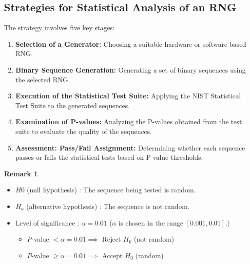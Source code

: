 \documentclass[12pt,openany]{book}
\theoremstyle{definition}
\newtheorem{remark}{Remark}[chapter]
\begin{document}
	\subsection{Strategies for Statistical Analysis of an RNG}
	The strategy involves five key stages:
	\begin{enumerate}
		\item \textbf{Selection of a Generator:} Choosing a suitable hardware or software-based RNG.
		\item \textbf{Binary Sequence Generation:} Generating a set of binary sequences using the selected RNG.
		\item \textbf{Execution of the Statistical Test Suite:} Applying the NIST Statistical Test Suite to the generated sequences.
		\item \textbf{Examination of P-values:} Analyzing the P-values obtained from the test suite to evaluate the quality of the sequences.
		\item \textbf{Assessment: Pass/Fail Assignment:} Determining whether each sequence passes or fails the statistical tests based on P-value thresholds.
	\end{enumerate}
	
	\begin{remark}
		\ \begin{itemize}
			\item 
			$H0$ (null hypothesis) : The sequence being tested is random.
			\item $H_a$ (alternative hypothesis) : The sequence is not random.
			\item Level of significance : $\alpha = 0.01$ ($\alpha$ is chosen in the range $[0.001, 0.01]$.)
			\begin{itemize}
				\item $P$-value $< \alpha = 0.01\implies$ Reject $H_0$ (not random)
				\item $P$-value $\geq \alpha = 0.01\implies$ Accept $H_0$ (random)
			\end{itemize}
		\end{itemize}
	\end{remark}
	
\end{document}
